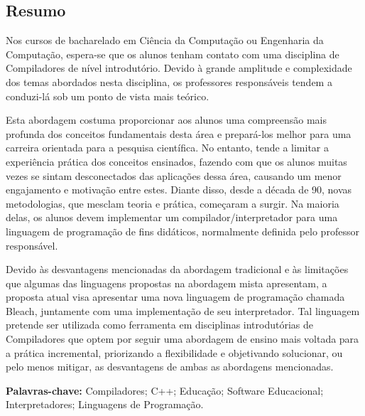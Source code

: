 \thispagestyle{empty}
\begin{spacing}{1.0}
\chapter*{Resumo}
Nos cursos de bacharelado em Ciência da Computação ou Engenharia da Computação, espera-se que os alunos tenham contato com uma disciplina de Compiladores de nível introdutório. Devido à grande amplitude e complexidade dos temas abordados nesta disciplina, os professores responsáveis tendem a conduzi-lá sob um ponto de vista mais teórico. 

Esta abordagem costuma proporcionar aos alunos uma compreensão mais profunda dos conceitos fundamentais desta área e prepará-los melhor para uma carreira orientada para a pesquisa científica. No entanto, tende a limitar a experiência prática dos conceitos ensinados, fazendo com que os alunos muitas vezes se sintam desconectados das aplicações dessa área, causando um menor engajamento e motivação entre estes. Diante disso, desde a década de 90, novas metodologias, que mesclam teoria e prática, começaram a surgir. Na maioria delas, os alunos devem implementar um compilador/interpretador para uma linguagem de programação de fins didáticos, normalmente definida pelo professor responsável.

Devido às desvantagens mencionadas da abordagem tradicional e às limitações que algumas das linguagens propostas na abordagem mista apresentam, a proposta atual visa apresentar uma nova linguagem de programação chamada Bleach, juntamente com uma implementação de seu interpretador. Tal linguagem pretende ser utilizada como ferramenta em disciplinas introdutórias de Compiladores que optem por seguir uma abordagem de ensino mais voltada para a prática incremental, priorizando a flexibilidade e objetivando solucionar, ou pelo menos mitigar, as desvantagens de ambas as abordagens mencionadas.

\textbf{Palavras-chave:} Compiladores; C++; Educação; Software Educacional; Interpretadores; Linguagens de Programação.
        
\clearpage
\end{spacing}